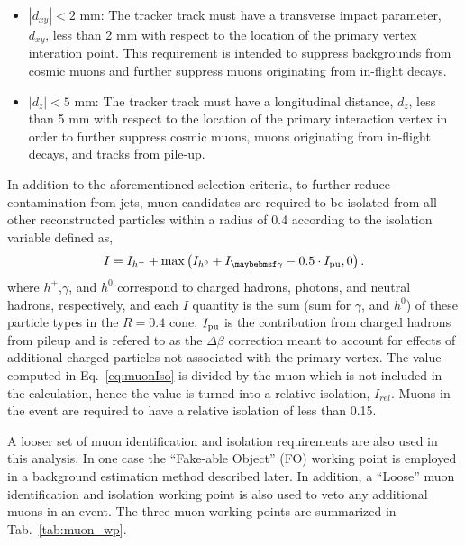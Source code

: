 \begin{itemize}
  \item $|{d_{xy}}|<2$ mm: The tracker track must have a transverse impact parameter, ${d_{xy}}$, less than 2 mm with respect to the location of the primary vertex interation point. This requirement is intended to suppress backgrounds from cosmic muons and further suppress muons originating from in-flight decays.
  \item $|{d_{z}}|<5$ mm: The tracker track must have a longitudinal distance, ${d_{z}}$, less than 5 mm with respect to the location of the primary interaction vertex in order to further suppress cosmic muons, muons originating from in-flight decays, and tracks from pile-up. 
\end{itemize}

In addition to the aforementioned selection criteria, to further reduce contamination from jets, muon candidates are required to be isolated from all other reconstructed particles within a radius of 0.4 according to the isolation variable defined as,
\begin{equation}
I = I_{h^+} + \max\left(I_{h^0} + I_{\gamma} - 0.5\cdot I_{\mbox{\scriptsize{pu}}}, 0\right).
\label{eq:muonIso}
\end{equation}
where $h^+$,$\gamma$, and $h^0$ correspond to charged hadrons, photons, and neutral hadrons, respectively, and each $I$ quantity is the sum \pt (sum \Et for $\gamma$, and $h^0$) of these particle types in the $R=0.4$ cone. $I_{\mbox{\scriptsize{pu}}}$ is the contribution from charged hadrons from pileup and is refered to as the $\Delta\beta$ correction meant to account for effects of additional charged particles not associated with the primary vertex. The value computed in Eq.~\ref{eq:muonIso} is divided by the muon \pt which is not included in the calculation, hence the value is turned into a relative isolation, $I_{rel}$. Muons in the event are required to have a relative isolation of less than 0.15.  

A looser set of muon identification and isolation requirements are also used in this analysis. In one case the ``Fake-able Object'' (FO) working point is employed in a background estimation method described later. In addition, a ``Loose'' muon identification and isolation working point is also used to veto any additional muons in an event. The three muon working points are summarized in Tab.~\ref{tab:muon_wp}.

